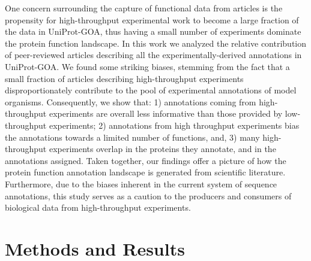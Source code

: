 \documentclass[12pt]{article}
\begin{document}
One concern surrounding the capture of functional data from articles is the propensity for
high-throughput experimental work to become a large fraction of the data in UniProt-GOA,
thus having  a small number of experiments dominate the protein function landscape.  In this
work we analyzed the relative contribution of peer-reviewed articles describing all the
experimentally-derived annotations in UniProt-GOA.  We found some striking biases, stemming
from the fact that a small fraction of articles describing high-throughput experiments
disproportionately contribute to the pool of experimental annotations of model organisms.
Consequently, we show that: 1) annotations coming from high-throughput experiments are
overall  less informative than those provided by low-throughput experiments;  2) annotations
from high throughput experiments bias the annotations towards a limited number of functions,
and, 3) many high-throughput experiments overlap in the proteins they annotate, and in the
annotations assigned. Taken together, our findings offer a  picture of
how the protein function annotation landscape is generated from scientific
literature. 
Furthermore, due to the biases inherent in
the current system of sequence annotations, this study serves as a caution to the producers
and consumers of biological data from high-throughput experiments. 


\section*{Methods and Results}
\end{document}
